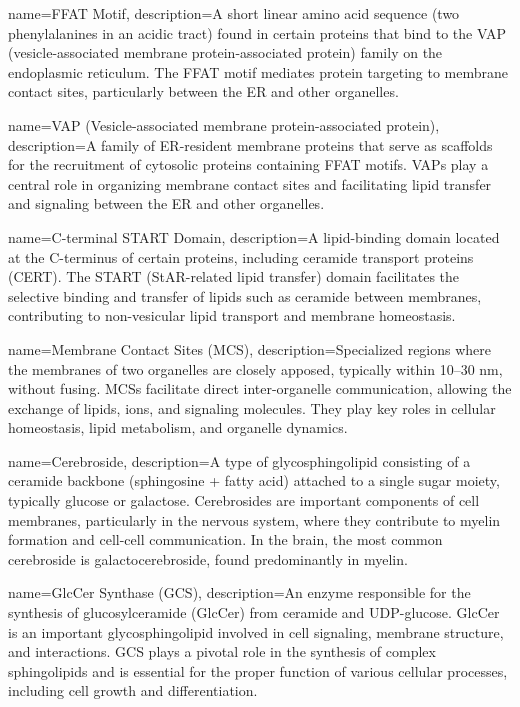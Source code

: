 {
    name={FFAT Motif},
    description={A short linear amino acid sequence (two phenylalanines in an acidic tract) found in certain proteins that bind to the VAP (vesicle-associated membrane protein-associated protein) family on the endoplasmic reticulum. The FFAT motif mediates protein targeting to membrane contact sites, particularly between the ER and other organelles.}
}

{
    name={VAP (Vesicle-associated membrane protein-associated protein)},
    description={A family of ER-resident membrane proteins that serve as scaffolds for the recruitment of cytosolic proteins containing FFAT motifs. VAPs play a central role in organizing membrane contact sites and facilitating lipid transfer and signaling between the ER and other organelles.}
}

{
    name={C-terminal START Domain},
    description={A lipid-binding domain located at the C-terminus of certain proteins, including ceramide transport proteins (CERT). The START (StAR-related lipid transfer) domain facilitates the selective binding and transfer of lipids such as ceramide between membranes, contributing to non-vesicular lipid transport and membrane homeostasis.}
}

{
    name={Membrane Contact Sites (MCS)},
    description={Specialized regions where the membranes of two organelles are closely apposed, typically within 10–30 nm, without fusing. MCSs facilitate direct inter-organelle communication, allowing the exchange of lipids, ions, and signaling molecules. They play key roles in cellular homeostasis, lipid metabolism, and organelle dynamics.}
}

{
    name={Cerebroside},
    description={A type of glycosphingolipid consisting of a ceramide backbone (sphingosine + fatty acid) attached to a single sugar moiety, typically glucose or galactose. Cerebrosides are important components of cell membranes, particularly in the nervous system, where they contribute to myelin formation and cell-cell communication. In the brain, the most common cerebroside is galactocerebroside, found predominantly in myelin.}
}

{
    name={GlcCer Synthase (GCS)},
    description={An enzyme responsible for the synthesis of glucosylceramide (GlcCer) from ceramide and UDP-glucose. GlcCer is an important glycosphingolipid involved in cell signaling, membrane structure, and interactions. GCS plays a pivotal role in the synthesis of complex sphingolipids and is essential for the proper function of various cellular processes, including cell growth and differentiation.}
}

